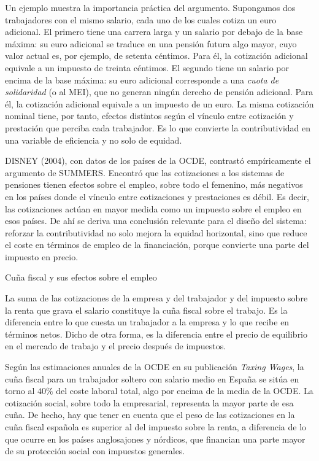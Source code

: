 \documentclass[10pt,a4paper]{article}
\begin{document}
Un ejemplo muestra la importancia práctica del argumento. Supongamos dos trabajadores con el mismo salario, cada uno de los cuales cotiza un euro adicional. El primero tiene una carrera larga y un salario por debajo de la base máxima: su euro adicional se traduce en una pensión futura algo mayor, cuyo valor actual es, por ejemplo, de setenta céntimos. Para él, la cotización adicional equivale a un impuesto de treinta céntimos. El segundo tiene un salario por encima de la base máxima: su euro adicional corresponde a una \textit{cuota de solidaridad} (o al MEI), que no generan ningún derecho de pensión adicional. Para él, la cotización adicional equivale a un impuesto de un euro. La misma cotización nominal tiene, por tanto, efectos distintos según el vínculo entre cotización y prestación que perciba cada trabajador. Es lo que convierte la contributividad en una variable de eficiencia y no solo de equidad.

DISNEY (2004), con datos de los países de la OCDE, contrastó empíricamente el argumento de SUMMERS. Encontró que las cotizaciones a los sistemas de pensiones tienen efectos sobre el empleo, sobre todo el femenino, más negativos en los países donde el vínculo entre cotizaciones y prestaciones es débil. Es decir, las cotizaciones actúan en mayor medida como un impuesto sobre el empleo en esos países. De ahí se deriva una conclusión relevante para el diseño del sistema: reforzar la contributividad no solo mejora la equidad horizontal, sino que reduce el coste en términos de empleo de la financiación, porque convierte una parte del impuesto en precio.

Cuña fiscal y sus efectos sobre el empleo

La suma de las cotizaciones de la empresa y del trabajador y del impuesto sobre la renta que grava el salario constituye la cuña fiscal sobre el trabajo. Es la diferencia entre lo que cuesta un trabajador a la empresa y lo que recibe en términos netos. Dicho de otra forma, es la diferencia entre el precio de equilibrio en el mercado de trabajo y el precio después de impuestos.

Según las estimaciones anuales de la OCDE en su publicación \textit{Taxing Wages}, la cuña fiscal para un trabajador soltero con salario medio en España se sitúa en torno al $40\%$ del coste laboral total, algo por encima de la media de la OCDE. La cotización social, sobre todo la empresarial, representa la mayor parte de esa cuña. De hecho, hay que tener en cuenta que el peso de las cotizaciones en la cuña fiscal española es superior al del impuesto sobre la renta, a diferencia de lo que ocurre en los países anglosajones y nórdicos, que financian una parte mayor de su protección social con impuestos generales.
\end{document}
